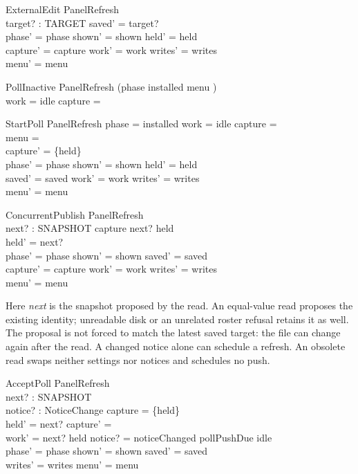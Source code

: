 \documentclass[a4paper,10pt,fleqn]{article}
\begin{document}
\begin{schema}{ExternalEdit}
  \Delta PanelRefresh \\
  target? : TARGET
\where
  saved' = target? \\
  phase' = phase \land shown' = shown \land held' = held \\
  capture' = capture \land work' = work \land writes' = writes \\
  menu' = menu
\end{schema}

\begin{schema}{PollInactive}
  \Xi PanelRefresh
\where
  (phase \neq installed \lor menu \neq \emptyset) \\
  work = idle \land capture = \emptyset
\end{schema}

\begin{schema}{StartPoll}
  \Delta PanelRefresh
\where
  phase = installed \land work = idle \land capture = \emptyset \\
  menu = \emptyset \\
  capture' = \{held\} \\
  phase' = phase \land shown' = shown \land held' = held \\
  saved' = saved \land work' = work \land writes' = writes \\
  menu' = menu
\end{schema}

\begin{schema}{ConcurrentPublish}
  \Delta PanelRefresh \\
  next? : SNAPSHOT
\where
  capture \neq \emptyset \land next? \neq held \\
  held' = next? \\
  phase' = phase \land shown' = shown \land saved' = saved \\
  capture' = capture \land work' = work \land writes' = writes \\
  menu' = menu
\end{schema}

Here \emph{next} is the snapshot proposed by the read. An equal-value
read proposes the existing identity; unreadable disk or an unrelated
roster refusal retains it as well. The proposal is not forced to match
the latest saved target: the file can change again after the read. A
changed notice alone can schedule a refresh. An obsolete read swaps
neither settings nor notices and schedules no push.

\begin{schema}{AcceptPoll}
  \Delta PanelRefresh \\
  next? : SNAPSHOT \\
  notice? : NoticeChange
\where
  capture = \{held\} \\
  held' = next? \land capture' = \emptyset \\
  work' = \IF next? \neq held \lor notice? = noticeChanged
    \THEN pollPushDue \ELSE idle \\
  phase' = phase \land shown' = shown \land saved' = saved \\
  writes' = writes \land menu' = menu
\end{schema}
\end{document}
